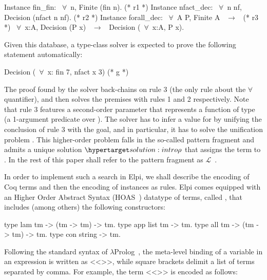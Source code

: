 \documentclass[sigconf,natbib=false,review]{acmart}
\newcommand{\llambda}{\ensuremath{\mathcal{L}}\xspace}
\begin{document}
\begin{coqcode}
Instance fin_fin: ~$\forall$~n, Finite (fin n).             (* r1 *)
Instance nfact_dec: ~$\forall$~n nf, Decision (nfact n nf). (* r2 *)
Instance forall_dec: ~$\forall$~A P, Finite A ~$\to$~            (* r3 *)
  ~$\forall$~x:A, Decision (P x) ~$\to$~ Decision (~$\forall$~x:A, P x).
\end{coqcode}

\noindent Given this database, a type-class solver is expected to
prove the following statement automatically:

\begin{coqcode}
  Decision (~$\forall$~x: fin 7, nfact x 3)                   (* g *)
\end{coqcode}

\noindent
The proof found by the solver back-chains on rule 3 (the only rule
about the $\forall$ quantifier), and then solves the premises with
rules 1 and 2 respectively.
Note that rule 3 features a second-order parameter  that represents
a function of type  (a 1-argument predicate over ).
The solver has to infer a value for  by unifying the conclusion
of rule 3 with the goal, and in particular, it has to solve the unification
problem . This higher-order problem falls in the so-called 
pattern fragment and admits a unique
solution $\customlabel{solution:intro}{\rho}$ that assigns
the term  to .
In the rest of this paper shall refer to the pattern fragment as
\llambda~\cite{miller92jsc}.

In order to implement such a search in Elpi, we shall describe the encoding
of Coq terms and then the encoding of instances as rules.
Elpi comes equipped with
an Higher Order Abstract Syntax (HOAS~\cite{10.1145/53990.54010}) datatype of
terms, called , that includes (among others) the following
constructors:

\begin{elpicode}
type lam  tm -> (tm -> tm) -> tm.     %
type app  list tm -> tm.              %
type all  tm -> (tm -> tm) -> tm.     %
type con  string -> tm.               %
\end{elpicode}

\noindent
Following the standard syntax of $\lambda$Prolog~\cite{miller_nadathur_2012},
the meta-level binding of a variable  in an expression
 is written as <<>>, while square brackets delimit a
list of terms separated by comma. For example, the term
<<>> is encoded as follows:
\end{document}
